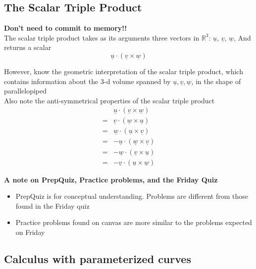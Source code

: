 \subsection{The Scalar Triple Product}

\begin{framed}
   \textbf{Don't need to commit to memory!!} \\
   The scalar triple product takes as its arguments three vectors in $ \mathbb{R}^3$:
      $ \underline{u}$, 
      $ \underline{v}$, 
      $ \underline{w}$,
   And returns a scalar
   \[
     \underline{u} \cdot \left( \underline{v} \times \underline{w} \right)
   \] 

   However, know the geometric interpretation of the scalar triple product, which contains information about the 3-d volume spanned by $ \underline{u}, \underline{v}, \underline{w}$, in the shape of parallelopiped \\

   Also note the anti-symmetrical properties of the scalar triple product
  \begin{align*}
       &  \underline{u} \cdot \left( \underline{v} \times \underline{w} \right) \\
     = &  \underline{v} \cdot \left( \underline{w} \times \underline{u} \right) \\
     = &  \underline{w} \cdot \left( \underline{u} \times \underline{v} \right) \\
     = & - \underline{u} \cdot \left( \underline{w} \times \underline{v} \right) \\
     = & - \underline{w} \cdot \left( \underline{v} \times \underline{u} \right) \\
     = & - \underline{v} \cdot \left( \underline{u} \times \underline{w} \right) 
  \end{align*}
\end{framed}


\textbf{A note on PrepQuiz, Practice problems, and the Friday Quiz}
\begin{itemize}
   \item PrepQuiz is for conceptual understanding. Problems are different from those found in the Friday quiz
   \item Practice problems found on canvas are more similar to the problems expected on Friday
\end{itemize}


\subsection{Calculus with parameterized curves}

